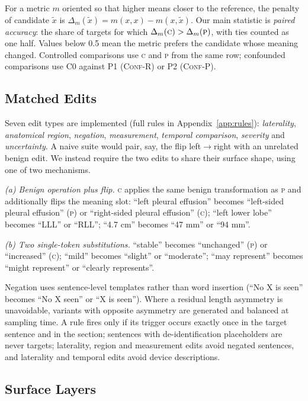 \documentclass[11pt]{article}
\newcommand{\Pc}{\textsc{p}\xspace}
\newcommand{\Cc}{\textsc{c}\xspace}
\newcommand{\confr}{\textsc{Conf-R}\xspace}
\newcommand{\confp}{\textsc{Conf-P}\xspace}
\begin{document}
For a metric $m$ oriented so that higher means closer to the reference, the penalty of candidate $\tilde{x}$ is $\Delta_m(\tilde{x}) = m(x,x) - m(x,\tilde{x})$. Our main statistic is \emph{paired accuracy}: the share of targets for which $\Delta_m(\Cc) > \Delta_m(\Pc)$, with ties counted as one half. Values below 0.5 mean the metric prefers the candidate whose meaning changed. Controlled comparisons use \Cc and \Pc from the same row; confounded comparisons use C0 against P1 (\confr) or P2 (\confp).

\subsection{Matched Edits}

Seven edit types are implemented (full rules in Appendix~\ref{app:rules}): \emph{laterality}, \emph{anatomical region}, \emph{negation}, \emph{measurement}, \emph{temporal comparison}, \emph{severity} and \emph{uncertainty}. A naive suite would pair, say, the flip left$\to$right with an unrelated benign edit. We instead require the two edits to share their surface shape, using one of two mechanisms.

\emph{(a) Benign operation plus flip.} \Cc applies the same benign transformation as \Pc and additionally flips the meaning slot: ``left pleural effusion'' becomes ``left-sided pleural effusion'' (\Pc) or ``right-sided pleural effusion'' (\Cc); ``left lower lobe'' becomes ``LLL'' or ``RLL''; ``4.7 cm'' becomes ``47 mm'' or ``94 mm''.

\emph{(b) Two single-token substitutions.} ``stable'' becomes ``unchanged'' (\Pc) or ``increased'' (\Cc); ``mild'' becomes ``slight'' or ``moderate''; ``may represent'' becomes ``might represent'' or ``clearly represents''.

Negation uses sentence-level templates rather than word insertion (``No X is seen'' becomes ``No X seen'' or ``X is seen''). Where a residual length asymmetry is unavoidable, variants with opposite asymmetry are generated and balanced at sampling time.
A rule fires only if its trigger occurs exactly once in the target sentence and in the section; sentences with de-identification placeholders are never targets; laterality, region and measurement edits avoid negated sentences, and laterality and temporal edits avoid device descriptions.

\subsection{Surface Layers}
\end{document}
